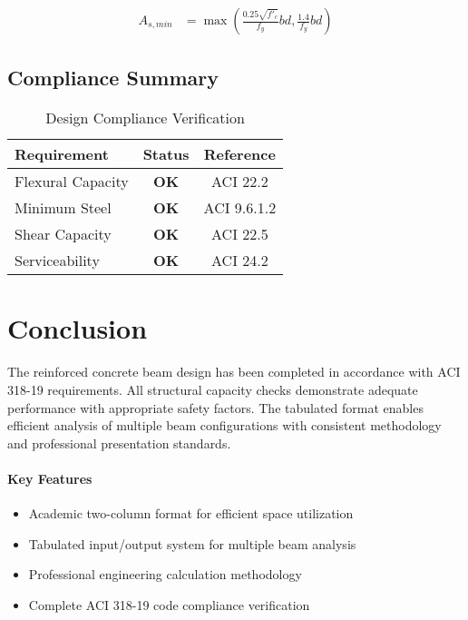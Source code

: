 \documentclass[
  10pt,
  letterpaper,
  twocolumn
]{article}
\begin{document}
\begin{align}
A_{s,min} &= \max\left(\frac{0.25\sqrt{f'_c}}{f_y}bd, \frac{1.4}{f_y}bd\right) \label{eq:steel_min}
\end{align}

\subsection{Compliance Summary}

\begin{table}[h]
\centering
\caption{Design Compliance Verification}
\label{tab:compliance}
\begin{tabular}{@{}lcc@{}}
\toprule
\textbf{Requirement} & \textbf{Status} & \textbf{Reference} \\
\midrule
Flexural Capacity & \textcolor{ghaligreen}{\textbf{OK}} & ACI 22.2 \\
Minimum Steel & \textcolor{ghaligreen}{\textbf{OK}} & ACI 9.6.1.2 \\
Shear Capacity & \textcolor{ghaligreen}{\textbf{OK}} & ACI 22.5 \\
Serviceability & \textcolor{ghaligreen}{\textbf{OK}} & ACI 24.2 \\
\bottomrule
\end{tabular}
\end{table}

\section{Conclusion}

The reinforced concrete beam design has been completed in accordance with ACI 318-19 requirements. All structural capacity checks demonstrate adequate performance with appropriate safety factors. The tabulated format enables efficient analysis of multiple beam configurations with consistent methodology and professional presentation standards.

\paragraph{Key Features}
\begin{itemize}
\item Academic two-column format for efficient space utilization
\item Tabulated input/output system for multiple beam analysis
\item Professional engineering calculation methodology
\item Complete ACI 318-19 code compliance verification
\end{itemize}
\end{document}
